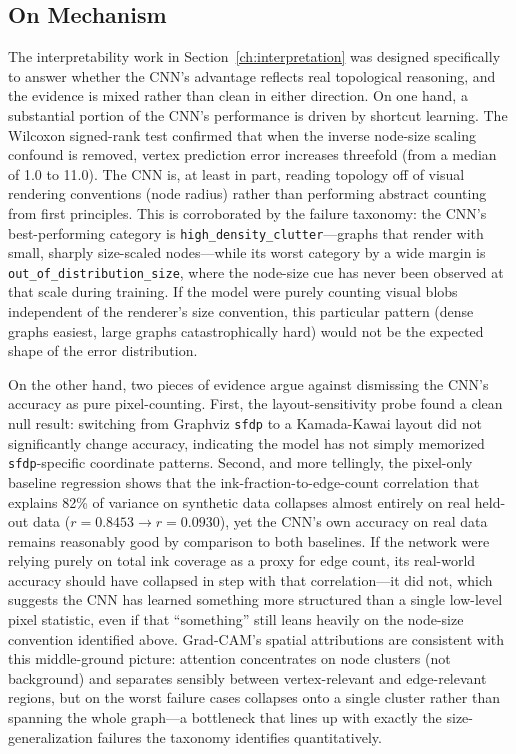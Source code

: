 \documentclass[11pt,letterpaper]{article}
\numberwithin{equation}{section}
\numberwithin{figure}{section}
\numberwithin{table}{section}
\begin{document}
\subsection{On Mechanism}
The interpretability work in Section~\ref{ch:interpretation} was designed specifically to answer whether the CNN's advantage reflects real topological reasoning, and the evidence is mixed rather than clean in either direction. On one hand, a substantial portion of the CNN's performance is driven by shortcut learning. The Wilcoxon signed-rank test confirmed that when the inverse node-size scaling confound is removed, vertex prediction error increases threefold (from a median of 1.0 to 11.0). The CNN is, at least in part, reading topology off of visual rendering conventions (node radius) rather than performing abstract counting from first principles. This is corroborated by the failure taxonomy: the CNN's best-performing category is \texttt{high\_density\_clutter}---graphs that render with small, sharply size-scaled nodes---while its worst category by a wide margin is \texttt{out\_of\_distribution\_size}, where the node-size cue has never been observed at that scale during training. If the model were purely counting visual blobs independent of the renderer's size convention, this particular pattern (dense graphs easiest, large graphs catastrophically hard) would not be the expected shape of the error distribution.

On the other hand, two pieces of evidence argue against dismissing the CNN's accuracy as pure pixel-counting. First, the layout-sensitivity probe found a clean null result: switching from Graphviz \texttt{sfdp} to a Kamada-Kawai layout did not significantly change accuracy, indicating the model has not simply memorized \texttt{sfdp}-specific coordinate patterns. Second, and more tellingly, the pixel-only baseline regression shows that the ink-fraction-to-edge-count correlation that explains 82\% of variance on synthetic data collapses almost entirely on real held-out data ($r=0.8453 \to r=0.0930$), yet the CNN's own accuracy on real data remains reasonably good by comparison to both baselines. If the network were relying purely on total ink coverage as a proxy for edge count, its real-world accuracy should have collapsed in step with that correlation---it did not, which suggests the CNN has learned something more structured than a single low-level pixel statistic, even if that ``something'' still leans heavily on the node-size convention identified above. Grad-CAM's spatial attributions are consistent with this middle-ground picture: attention concentrates on node clusters (not background) and separates sensibly between vertex-relevant and edge-relevant regions, but on the worst failure cases collapses onto a single cluster rather than spanning the whole graph---a bottleneck that lines up with exactly the size-generalization failures the taxonomy identifies quantitatively.
\end{document}
